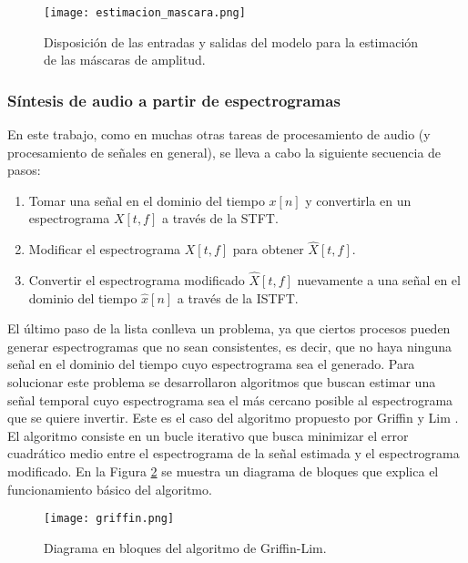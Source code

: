\begin{figure}[H]
  \centering{}
  \texttt{[image: estimacion\_mascara.png]}
  \caption{Disposición de las entradas y salidas del modelo para la estimación de las máscaras de amplitud.}
  \label{fig:red_estim}
\end{figure}
  


\subsubsection{Síntesis de audio a partir de espectrogramas}

En este trabajo, como en muchas otras tareas de procesamiento de audio (y procesamiento de señales en general), se lleva a cabo la siguiente secuencia de pasos:

\begin{enumerate}
\item Tomar una señal en el dominio del tiempo $x[n]$ y convertirla en un espectrograma $X[t,f]$ a través de la STFT.
\item Modificar el espectrograma $X[t,f]$ para obtener $\hat{X}[t,f]$. 
\item Convertir el espectrograma modificado $\hat{X}[t,f]$ nuevamente a una señal en el dominio del tiempo $\hat{x}[n]$ a través de la ISTFT.
\end{enumerate}

El último paso de la lista conlleva un problema, ya que ciertos procesos pueden generar espectrogramas que no sean consistentes, es decir, que no haya ninguna señal en el dominio del tiempo cuyo espectrograma sea el generado. Para solucionar este problema se desarrollaron algoritmos que buscan estimar una señal temporal cuyo espectrograma sea el más cercano posible al espectrograma que se quiere invertir. Este es el caso del algoritmo propuesto por Griffin y Lim \cite{griffinlim}. El algoritmo consiste en un bucle iterativo que busca minimizar el error cuadrático medio entre el espectrograma de la señal estimada y el espectrograma modificado. En la Figura \ref{fig:griffin} se muestra un diagrama de bloques que explica el funcionamiento básico del algoritmo. 

\begin{figure}[H]
  \centering{}
  \texttt{[image: griffin.png]}
  \caption{Diagrama en bloques del algoritmo de Griffin-Lim.}
  \label{fig:griffin}
\end{figure}

